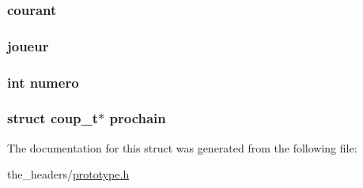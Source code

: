 \subsubsection[{\texorpdfstring{courant}{courant}}]{ courant}\hypertarget{structcoup__t_a23bc58e9e0e54e9f173c2cb43bc127e9}{}\label{structcoup__t_a23bc58e9e0e54e9f173c2cb43bc127e9}
\subsubsection[{\texorpdfstring{joueur}{joueur}}]{ joueur}\hypertarget{structcoup__t_a5a01f66d53ebc32c2b2783fe2174aef8}{}\label{structcoup__t_a5a01f66d53ebc32c2b2783fe2174aef8}
\subsubsection[{\texorpdfstring{numero}{numero}}]{\setlength{\rightskip}{0pt plus 5cm}int numero}\hypertarget{structcoup__t_a2c30f43104974e72e2809fb4569804b0}{}\label{structcoup__t_a2c30f43104974e72e2809fb4569804b0}
\subsubsection[{\texorpdfstring{prochain}{prochain}}]{\setlength{\rightskip}{0pt plus 5cm}struct {\bf coup\+\_\+t}$\ast$ prochain}\hypertarget{structcoup__t_a6061643e85d05b42fd9eb356c664b38e}{}\label{structcoup__t_a6061643e85d05b42fd9eb356c664b38e}


The documentation for this struct was generated from the following file\+:\begin{DoxyCompactItemize}
\item 
the\+\_\+headers/\hyperlink{prototype_8h}{prototype.\+h}\end{DoxyCompactItemize}
